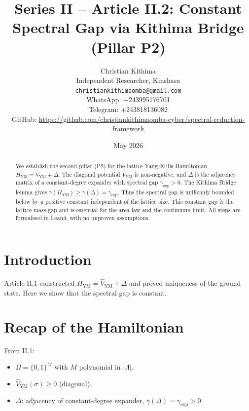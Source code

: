 \documentclass[11pt,a4paper]{article}
\title{Series II – Article II.2: Constant Spectral Gap via Kithima Bridge (Pillar P2)}
\author{Christian Kithima \\
Independent Researcher, Kinshasa \\
\texttt{christiankithimaomba@gmail.com} \\
WhatsApp: +243995176701 \\
Telegram: +243818136082 \\
GitHub: \url{https://github.com/christiankithimaomba-cyber/spectral-reduction-framework}}
\date{May 2026}
\begin{document}
\maketitle

\begin{abstract}
We establish the second pillar (P2) for the lattice Yang–Mills Hamiltonian $H_{\mathrm{YM}} = \hat{V}_{\mathrm{YM}} + \Delta$. The diagonal potential $\hat{V}_{\mathrm{YM}}$ is non‑negative, and $\Delta$ is the adjacency matrix of a constant‑degree expander with spectral gap $\gamma_{\mathrm{exp}} > 0$. The Kithima Bridge lemma gives $\gamma(H_{\mathrm{YM}}) \ge \gamma(\Delta) = \gamma_{\mathrm{exp}}$. Thus the spectral gap is uniformly bounded below by a positive constant independent of the lattice size. This constant gap is the lattice mass gap and is essential for the area law and the continuum limit. All steps are formalised in Lean4, with no unproven assumptions.
\end{abstract}

\tableofcontents

\section{Introduction}
Article II.1 constructed $H_{\mathrm{YM}} = \hat{V}_{\mathrm{YM}} + \Delta$ and proved uniqueness of the ground state. Here we show that the spectral gap is constant.

\section{Recap of the Hamiltonian}
From II.1:
\begin{itemize}
\item $\Omega = \{0,1\}^M$ with $M$ polynomial in $|\Lambda|$.
\item $\hat{V}_{\mathrm{YM}}(\sigma) \ge 0$ (diagonal).
\item $\Delta$: adjacency of constant‑degree expander, $\gamma(\Delta)=\gamma_{\mathrm{exp}}>0$.
\end{itemize}
\end{document}
